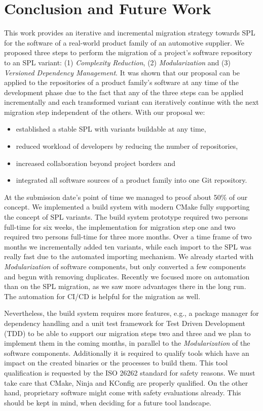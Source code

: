 \section{Conclusion and Future Work}\label{conclusion}

This work provides an iterative and incremental migration strategy towards SPL
for the software of a real-world product family of an automotive supplier. We
proposed three steps to perform the migration of a project's software repository
to an SPL variant: (1) \textit{Complexity Reduction}, (2)
\textit{Modularization} and (3) \textit{Versioned Dependency Management}. It was
shown that our proposal can be applied to the repositories of a product family's
software at any time of the development phase due to the fact that any of the
three steps can be applied incrementally and each transformed variant can
iteratively continue with the next migration step independent of the others.
With our proposal we:

\begin{itemize}
  \item established a stable SPL with variants buildable at any time,
  \item reduced workload of developers by reducing the number of repositories,
  \item increased collaboration beyond project borders and
  \item integrated all software sources of a product family into one Git
        repository.
\end{itemize}

At the submission date's point of time we managed to proof about 50\% of our
concept. We implemented a build system with modern CMake fully supporting the
concept of SPL variants. The build system prototype required two persons
full-time for six weeks, the implementation for migration step one and two
required two persons full-time for three more months. Over a time frame of two
months we incrementally added ten variants, while each import to the SPL was
really fast due to the automated importing mechanism. We already started with
\textit{Modularization} of software components, but only converted a few
components and begun with removing duplicates. Recently we focused more on
automation than on the SPL migration, as we saw more advantages there in the
long run. The automation for CI/CD is helpful for the migration as well.

Nevertheless, the build system requires more features, e.g., a package manager
for dependency handling and a unit test framework for Test Driven Development
(TDD) to be able to support our migration steps two and three and we plan to
implement them in the coming months, in parallel to the \textit{Modularization}
of the software components. Additionally it is required to qualify tools which
have an impact on the created binaries or the processes to build them. This tool
qualification is requested by the ISO 26262 standard for safety reasons. We must
take care that CMake, Ninja and KConfig are properly qualified. On the other
hand, proprietary software might come with safety evaluations already. This
should be kept in mind, when deciding for a future tool landscape.

